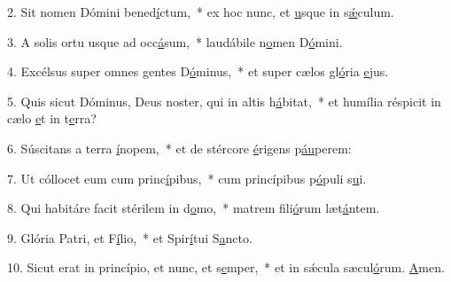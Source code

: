 2. Sit nomen Dómini bened\uline{í}ctum,~* ex hoc nunc, et \uline{u}sque in s\uline{ǽ}culum.\par 
3. A solis ortu usque ad occ\uline{á}sum,~* laudábile n\uline{o}men D\uline{ó}mini.\par 
4. Excélsus super omnes gentes D\uline{ó}minus,~* et super cælos gl\uline{ó}ria \uline{e}jus.\par 
5. Quis sicut Dóminus, Deus noster, qui in altis h\uline{á}bitat,~* et humília réspicit in cælo \uline{e}t in t\uline{e}rra?\par 
6. Súscitans a terra \uline{í}nopem,~* et de stércore \uline{é}rigens p\uline{áu}perem:\par 
7. Ut cóllocet eum cum princ\uline{í}pibus,~* cum princípibus p\uline{ó}puli s\uline{u}i.\par 
8. Qui habitáre facit stérilem in d\uline{o}mo,~* matrem fili\uline{ó}rum læt\uline{á}ntem.\par 
9. Glória Patri, et F\uline{í}lio,~* et Spir\uline{í}tui S\uline{a}ncto.\par 
10. Sicut erat in princípio, et nunc, et s\uline{e}mper,~* et in sǽcula sæcul\uline{ó}rum. \uline{A}men.\par 
